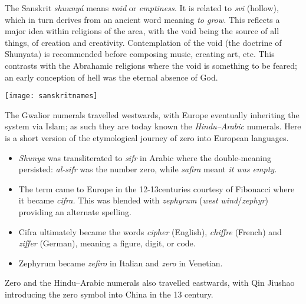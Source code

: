 \begin{minipage}[t]{0.59\linewidth}\vspace{-5pt}
	The Sanskrit \emph{shuunyá} means \emph{void} or \emph{emptiness.} It is related to \emph{svi} (hollow), which in turn derives from an ancient word meaning \emph{to grow.} This reflects a major idea within religions of the area, with the void being the source of all things, of creation and creativity. Contemplation of the void (the doctrine of Shunyata) is recommended before composing music, creating art, etc. This contrasts with the Abrahamic religions where the void is something to be feared; an early conception of hell was the eternal absence of God.
\end{minipage}
\hfill
\begin{minipage}[t]{0.4\linewidth}\vspace{-13pt}
	\flushright
	\texttt{[image: sanskritnames]}
\end{minipage}
\smallbreak
The Gwalior numerals travelled westwards, with Europe eventually inheriting the system via Islam; as such they are today known the \emph{Hindu--Arabic} numerals. Here is a short version of the etymological journey of zero into European languages.
\begin{itemize}
  \item \emph{Shunya} was transliterated to \emph{sifr} in Arabic where the double-meaning persisted: \emph{al-sifr} was the number zero, while \emph{safira} meant \emph{it was empty.}
  \item The term came to Europe in the 12\th{}-13\th centuries courtesy of Fibonacci where it became \emph{cifra.} This was blended with \emph{zephyrum} (\emph{west wind}/\emph{zephyr}) providing an alternate spelling.
  \item Cifra ultimately became the words \emph{cipher} (English), \emph{chiffre} (French) and \emph{ziffer} (German), meaning a figure, digit, or code.
  \item Zephyrum became \emph{zefiro} in Italian and \emph{zero} in Venetian.
\end{itemize}
Zero and the Hindu--Arabic numerals also travelled eastwards, with Qin Jiushao introducing the zero symbol into China in the 13\th{} century.
\bigbreak

